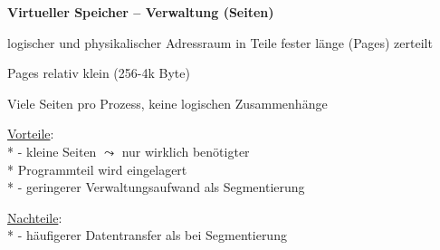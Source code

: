 \textbf{Virtueller Speicher -- Verwaltung (Seiten)}
\begin{items}
  \item logischer und physikalischer Adressraum in Teile fester länge (Pages) zerteilt
  \item Pages relativ klein (256-4k Byte)
  \item Viele Seiten pro Prozess, keine logischen Zusammenhänge
  \item \underline{Vorteile}: \\*
    - kleine Seiten \( \leadsto \) nur wirklich benötigter \\* \phantom{-} Programmteil wird eingelagert \\*
    - geringerer Verwaltungsaufwand als Segmentierung
  \item \underline{Nachteile}: \\*
    - häufigerer Datentransfer als bei Segmentierung
\end{items}